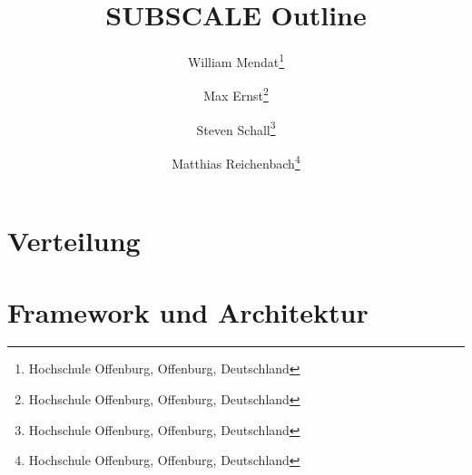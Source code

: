 \documentclass[]{lni}
\begin{document}
\title[SUBSCALE]{SUBSCALE Outline}
    \author[William Mendat \and Max Ernst \and Steven Schall \and Matthias Reichenbach]
    {William Mendat\footnote{Hochschule Offenburg, Offenburg,
        Deutschland } \and
    Max Ernst\footnote{Hochschule Offenburg, Offenburg,
        Deutschland } \and
    Steven Schall\footnote{Hochschule Offenburg, Offenburg,
        Deutschland } \and
    Matthias Reichenbach\footnote{Hochschule Offenburg, Offenburg,
        Deutschland }}
    \maketitle

	\section{Verteilung}
		
		
		
		
	\section{Framework und Architektur}
    	
    	
    	
    	

%
\end{document}
